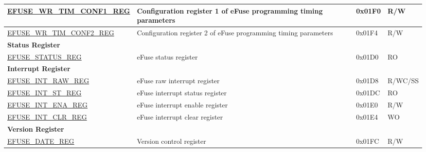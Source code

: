 \begin{longtable}{ | p{6cm} | p{7.2cm} | p{1.3cm} | p{1cm} | }
\hyperref[regdesc:EFUSEWRTIMCONF1REG]{EFUSE\_WR\_TIM\_CONF1\_REG} & Configuration register 1 of eFuse programming timing parameters  & 0x01F0 & R/W \\ \hline
\hyperref[regdesc:EFUSEWRTIMCONF2REG]{EFUSE\_WR\_TIM\_CONF2\_REG} & Configuration register 2 of eFuse programming timing parameters  & 0x01F4 & R/W \\ \hline
\multicolumn{4}{|l|}{\textbf{Status Register}} \\ \hline
\hyperref[regdesc:EFUSESTATUSREG]{EFUSE\_STATUS\_REG} & eFuse status register  & 0x01D0 & RO \\ \hline
\multicolumn{4}{|l|}{\textbf{Interrupt Register}} \\ \hline
\hyperref[regdesc:EFUSEINTRAWREG]{EFUSE\_INT\_RAW\_REG} & eFuse raw interrupt register  & 0x01D8 & R/WC/SS \\ \hline
\hyperref[regdesc:EFUSEINTSTREG]{EFUSE\_INT\_ST\_REG} & eFuse interrupt status register  & 0x01DC & RO \\ \hline
\hyperref[regdesc:EFUSEINTENAREG]{EFUSE\_INT\_ENA\_REG} & eFuse interrupt enable register  & 0x01E0 & R/W \\ \hline
\hyperref[regdesc:EFUSEINTCLRREG]{EFUSE\_INT\_CLR\_REG} & eFuse interrupt clear register  & 0x01E4 & WO \\ \hline
\multicolumn{4}{|l|}{\textbf{Version Register}} \\ \hline
\hyperref[regdesc:EFUSEDATEREG]{EFUSE\_DATE\_REG} & Version control register & 0x01FC & R/W \\ \hline
\end{longtable}
